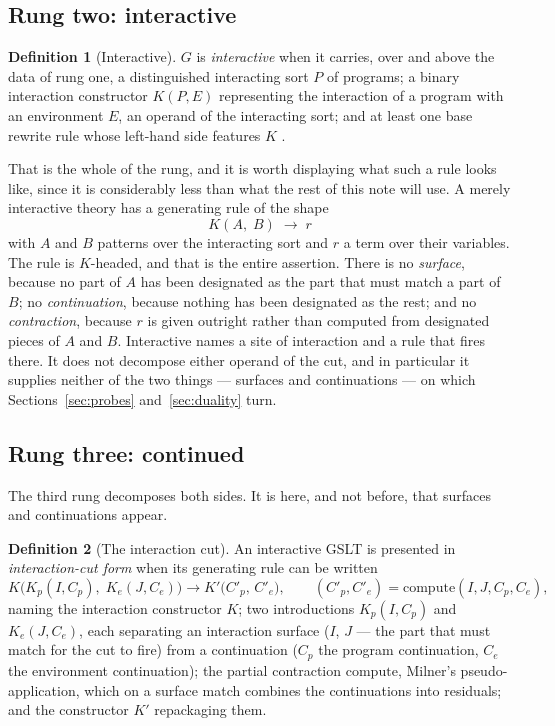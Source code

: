 \documentclass[11pt,a4paper]{article}
\theoremstyle{definition}
\newtheorem{definition}{Definition}[section]
\theoremstyle{plain}
\theoremstyle{remark}
\newcommand{\compute}{\mathrm{compute}}
\begin{document}
\subsection{Rung two: interactive}

\begin{definition}[Interactive]
\label{def:interactive}
$G$ is \emph{interactive} when it carries, over and above the data of rung one, a distinguished
interacting sort $P$ of programs; a binary interaction constructor $K(P,E)$ representing the
interaction of a program with an environment $E$, an operand of the interacting sort; and at least
one base rewrite rule whose left-hand side features $K$ \cite[Def.~2.2]{probe}.
\end{definition}

That is the whole of the rung, and it is worth displaying what such a rule looks like, since it is
considerably less than what the rest of this note will use. A merely interactive theory has a
generating rule of the shape
\[
K(A,\; B) \;\longrightarrow\; r
\tag{$\ddagger$}
\]
with $A$ and $B$ patterns over the interacting sort and $r$ a term over their variables. The rule is
$K$-headed, and that is the entire assertion. There is no \emph{surface}, because no part of $A$ has
been designated as the part that must match a part of $B$; no \emph{continuation}, because nothing
has been designated as the rest; and no \emph{contraction}, because $r$ is given outright rather
than computed from designated pieces of $A$ and $B$. Interactive names a site of interaction and a
rule that fires there. It does not decompose either operand of the cut, and in particular it
supplies neither of the two things --- surfaces and continuations --- on which
Sections~\ref{sec:probes} and~\ref{sec:duality} turn.

\subsection{Rung three: continued}

The third rung decomposes both sides. It is here, and not before, that surfaces and continuations
appear.

\begin{definition}[The interaction cut]
\label{def:cut}
An interactive GSLT is presented in \emph{interaction-cut form} when its generating rule can be
written
\[
K\bigl(K_p(I, C_p),\; K_e(J, C_e)\bigr) \longrightarrow K'\bigl(C'_p,\, C'_e\bigr),
\qquad (C'_p, C'_e) = \compute(I,J,C_p,C_e),
\tag{$\dagger$}
\]
naming the interaction constructor $K$; two introductions $K_p(I,C_p)$ and $K_e(J,C_e)$, each
separating an interaction surface ($I$, $J$ --- the part that must match for the cut to fire) from a
continuation ($C_p$ the program continuation, $C_e$ the environment continuation); the partial
contraction $\compute$, Milner's pseudo-application, which on a surface match combines the
continuations into residuals; and the constructor $K'$ repackaging them.
\end{definition}
\end{document}
